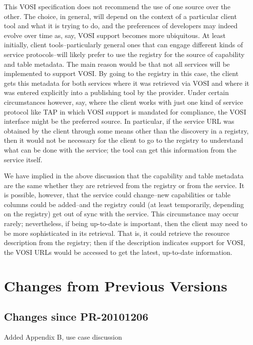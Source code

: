 \documentclass[11pt,letter]{ivoa}
\begin{document}
This VOSI specification does not recommend the use of one source over the other. The choice, in general, will depend on the context of a particular client tool and what it is trying to do, and the preferences of developers may indeed evolve over time as, say, VOSI support becomes more ubiquitous. At least initially, client tools--particularly general ones that can engage different kinds of service protocols--will likely prefer to use the registry for the source of capability and table metadata. The main reason would be that not all services will be implemented to support VOSI. By going to the registry in this case, the client gets this metadata for both services where it was retrieved via VOSI and where it was entered explicitly into a publishing tool by the provider. Under certain circumstances however, say, where the client works with just one kind of service protocol like TAP in which VOSI support is mandated for compliance, the VOSI interface might be the preferred source. In particular, if the service URL was obtained by the client through some means other than the discovery in a registry, then it would not be necessary for the client to go to the registry to understand what can be done with the service; the tool can get this information from the service itself. 

We have implied in the above discussion that the capability and table metadata are the same whether they are retrieved from the registry or from the service. It is possible, however, that the service could change--new capabilities or table columns could be added--and the registry could (at least temporarily, depending on the registry) get out of sync with the service. This circumstance may occur rarely; nevertheless, if being up-to-date is important, then the client may need to be more sophisticated in its retrieval. That is, it could retrieve the resource description from the registry; then if the description indicates support for VOSI, the VOSI URLs would be accessed to get the latest, up-to-date information. 

\section{Changes from Previous Versions}

\subsection{Changes since PR-20101206}

Added Appendix B, use case discussion
    
\end{document}

